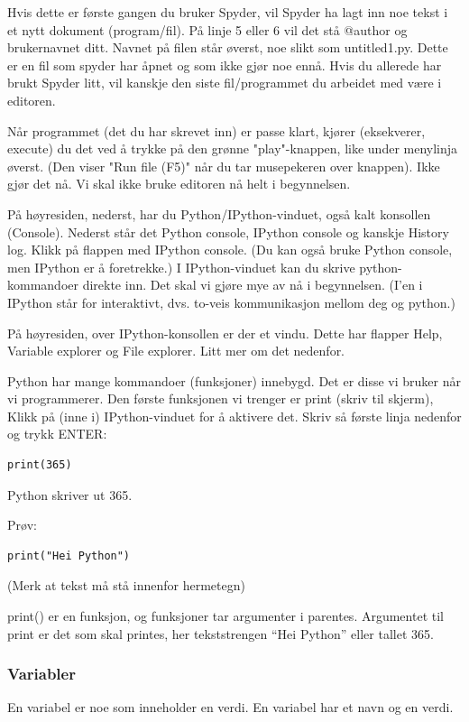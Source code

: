 Hvis dette er første gangen du bruker Spyder, vil Spyder ha lagt inn noe tekst i et nytt dokument (program/fil). På linje 5 eller 6 vil det stå @author og brukernavnet ditt. Navnet på filen står øverst, noe slikt som untitled1.py. Dette er en fil som spyder har åpnet og som ikke gjør noe ennå. Hvis du allerede har brukt Spyder litt, vil kanskje den siste fil/programmet du arbeidet med være i editoren.

Når programmet (det du har skrevet inn) er passe klart, kjører (eksekverer, execute) du det ved å trykke på den grønne "play"-knappen, like under menylinja øverst. (Den viser "Run file (F5)" når du tar musepekeren over knappen). Ikke gjør det nå. Vi skal ikke bruke editoren nå helt i begynnelsen.

På høyresiden, nederst, har du Python/IPython-vinduet, også kalt konsollen (Console). Nederst står det  Python console, IPython console og kanskje History log. Klikk på flappen med IPython console. (Du kan også bruke Python console, men IPython er å foretrekke.) I IPython-vinduet kan du skrive python-kommandoer direkte inn. Det skal vi gjøre mye av nå i begynnelsen. (I'en i IPython står for interaktivt, dvs. to-veis kommunikasjon mellom deg og python.) 

På høyresiden, over IPython-konsollen er der et vindu. Dette har flapper Help, Variable explorer og File explorer. Litt mer om det nedenfor. 

Python har mange kommandoer (funksjoner) innebygd. Det er disse vi bruker når vi programmerer. Den første funksjonen vi trenger er print (skriv til skjerm), Klikk på (inne i) IPython-vinduet for å aktivere det. Skriv så første linja nedenfor og trykk ENTER:
\begin{lstlisting}[caption={Din første Python kode}]
print(365)
\end{lstlisting}
Python skriver ut 365.

Prøv:
\begin{lstlisting}[caption={Din andre Python kode}]
print("Hei Python")
\end{lstlisting}

(Merk at tekst må stå innenfor hermetegn)

print() er en funksjon, og funksjoner tar argumenter i parentes. Argumentet til print er det som skal printes, her tekststrengen ``Hei Python'' eller tallet 365. 

\subsubsection{Variabler}
En variabel er noe som inneholder en verdi. En variabel har et navn og en verdi.

